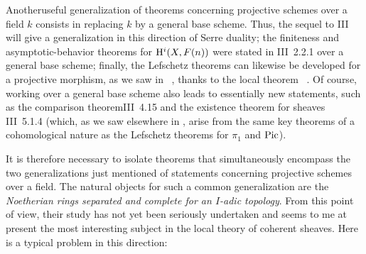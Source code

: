 Another\pageoriginale useful generalization of theorems concerning projective schemes over a field $k$ consists in replacing $k$ by a general base scheme. Thus, the sequel to {\EGA III} will give a generalization in this direction of Serre duality; the finiteness and asymptotic-behavior theorems for $\mathrm H^i(X, F(n))$ were stated in \EGA III~2.2.1 over a general base scheme; finally, the Lefschetz theorems can likewise be developed for a projective morphism, as we saw in ~, thanks to the local theorem ~. Of course, working over a general base scheme also leads to essentially new statements, such as the \og comparison theorem\fg \EGA III~4.15 and the existence theorem for sheaves \EGA III~5.1.4 (which, as we saw elsewhere in , arise from the same key theorems of a cohomological nature as the Lefschetz theorems for $\pi_1$ and $\operatorname{Pic}$).

It is therefore necessary to isolate theorems that simultaneously encompass the two generalizations just mentioned of statements concerning projective schemes over a field. The natural objects for such a common generalization are the \emph{Noetherian rings separated and complete for an $I$-adic topology}. From this point of view, their study has not yet been seriously undertaken and seems to me at present the most interesting subject in the local theory of coherent sheaves. Here is a typical problem in this direction:

